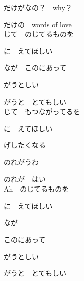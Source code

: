{だけがなの？　why？

だけの　words of love
\\

じて　のじてるものを

に　えてほしい

なが　このにあって

がうとしい

がうと　とてもしい
\\

じて　もつながってるを

に　えてほしい

げしたくなる　

のれがうわ

のれが　はい
\\

Ah　のじてるものを

に　えてほしい

なが

このにあって

がうとしい

がうと　とてもしい

}